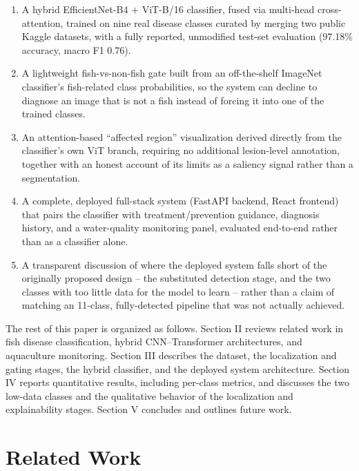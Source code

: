 \documentclass[conference]{IEEEtran}
\begin{document}
\begin{enumerate}
\item A hybrid EfficientNet-B4 + ViT-B/16 classifier, fused via multi-head cross-attention, trained on nine real disease classes curated by merging two public Kaggle datasets, with a fully reported, unmodified test-set evaluation (97.18\% accuracy, macro F1 0.76).
\item A lightweight fish-vs-non-fish gate built from an off-the-shelf ImageNet classifier's fish-related class probabilities, so the system can decline to diagnose an image that is not a fish instead of forcing it into one of the trained classes.
\item An attention-based ``affected region'' visualization derived directly from the classifier's own ViT branch, requiring no additional lesion-level annotation, together with an honest account of its limits as a saliency signal rather than a segmentation.
\item A complete, deployed full-stack system (FastAPI backend, React frontend) that pairs the classifier with treatment/prevention guidance, diagnosis history, and a water-quality monitoring panel, evaluated end-to-end rather than as a classifier alone.
\item A transparent discussion of where the deployed system falls short of the originally proposed design -- the substituted detection stage, and the two classes with too little data for the model to learn -- rather than a claim of matching an 11-class, fully-detected pipeline that was not actually achieved.
\end{enumerate}

The rest of this paper is organized as follows. Section II reviews related work in fish disease classification, hybrid CNN--Transformer architectures, and aquaculture monitoring. Section III describes the dataset, the localization and gating stages, the hybrid classifier, and the deployed system architecture. Section IV reports quantitative results, including per-class metrics, and discusses the two low-data classes and the qualitative behavior of the localization and explainability stages. Section V concludes and outlines future work.

\section{Related Work}
\end{document}
